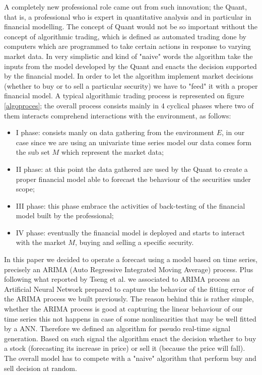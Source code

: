 \documentclass[twocolumn]{article}
\begin{document}
A completely new professional role came out from such innovation; the Quant, that is, a professional who is expert in quantitative analysis and in particular in financial modelling. The concept of Quant would not be so important without the concept of algorithmic trading, which is defined as automated trading done by computers which are programmed to take certain actions in response to varying market data. In very simplistic and kind of "naive" words the algorithm take the inputs from the model developed by the Quant and enacts the decision supported by the financial model.
In order to let the algorithm implement market decisions (whether to buy or to sell a particular security) we have to "feed" it with a proper financial model. A typical algorithmic trading process is represented on figure \ref{algoproces}; the overall process consists mainly in 4 cyclical phases where two of them interacts comprehend interactions with the environment, as follows:

\begin{itemize}
\item I phase: consists manly on data gathering from the environment $E$, in our case since we are using an univariate time series model our data comes form the sub set $M$ which represent the market data;
\item II phase: at this point the data gathered are used by the Quant to create a proper financial model able to forecast the behaviour of the securities under scope; 
\item III phase: this phase embrace the activities of back-testing of the financial model built by the professional;
\item IV phase: eventually the financial model is deployed and starts to interact with the market $M$, buying and selling a specific security.
\end{itemize}

In this paper we decided to operate a forecast using a model based on time series, precisely an ARIMA (Auto Regressive Integrated Moving Average) process. Plus following what reported by Tseng et al.\cite{zhang_time_2003} we associated to ARIMA process an Artificial Neural Network prepared to capture the behavior of the fitting error of the ARIMA process we built previously. The reason behind this is rather simple, whether the ARIMA process is good at capturing the linear behaviour of our time series this not happens in case of some nonlinearities that may be well fitted by a ANN.
Therefore we defined an algorithm for pseudo real-time signal generation. Based on such signal the algorithm enact the decision whether to buy a stock (forecasting its increase in price) or sell it (because the price will fall). The overall model has to compete with a "naive" algorithm that perform buy and sell decision at random.
\end{document}
